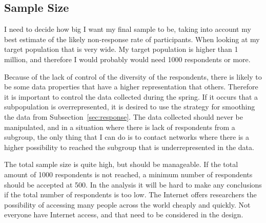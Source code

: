     \subsection{Sample Size} \label{sec:samplesize}




    I need to decide how big I want my final sample to be, taking into account my best estimate of the likely non-response rate of participants. When looking at my target population that is very wide. My target population is higher than 1 million, and therefore I would probably would need 1000 respondents or more.

    Because of the lack of control of the diversity of the respondents, there is likely to be some data properties that have a higher representation that others. Therefore it is important to control the data collected during the spring. If it occurs that a subpopulation is overrepresented, it is desired to use the strategy for smoothing the data from Subsection~\ref{sec:response}. The data collected should never be manipulated, and in a situation where there is lack of respondents from a subgroup, the only thing that I can do is to contact networks where there is a higher possibility to reached the subgroup that is underrepresented in the data.

    The total sample size is quite high, but should be manageable. If the total amount of 1000 respondents is not reached, a minimum number of respondents should be accepted at 500. In the analysis it will be hard to make any conclusions if the total number of respondents is too low.  The Internet offers researchers the possibility of accessing many people across the world cheaply and quickly. Not everyone have Internet access, and that need to be considered in the design.


